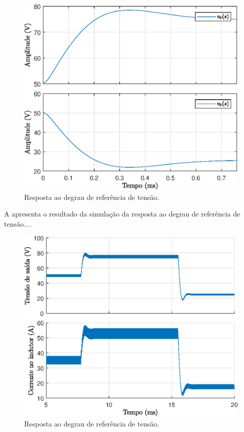 \begin{figure}[!ht]
	\centering
	\includegraphics[width=0.9\linewidth]{Figs/StepResponse1malha}
	\caption{Resposta ao degrau de referência de tensão.}
	\label{fig:stepresponse1malha}
\end{figure}




A  apresenta o resultado da simulação da resposta ao degrau de referência de tensão....

\begin{figure}[!ht]
	\centering
	\includegraphics[width=0.9\linewidth]{Figs/Buck1malha}
	\caption{Resposta ao degrau de referência de tensão.}
	\label{fig:buck1malha}
\end{figure}


